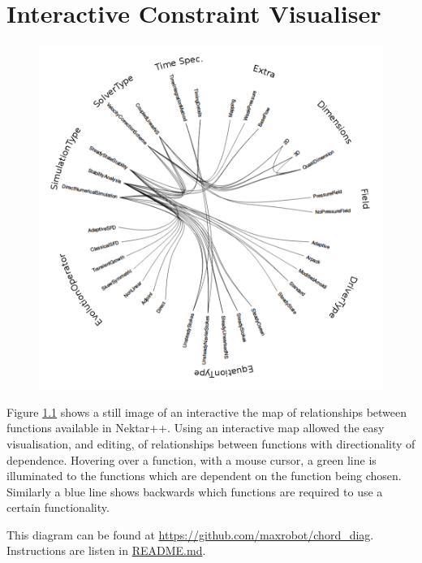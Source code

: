 \documentclass[11pt, a4paper]{report}
\begin{document}
\chapter{Interactive Constraint Visualiser}
\label{app:constraints}

\begin{figure}[htb!]
 \centering
 \includegraphics[width=.9\linewidth,  clip=true, trim = 0cm 0cm 0cm 0cm]{constraint_mapping}
 \label{fig:constraint_mapping}
\end{figure}

Figure \ref{fig:constraint_mapping} shows a still image of an interactive the map of relationships between functions available in Nektar++. Using an interactive map allowed the easy visualisation, and editing, of relationships between functions with directionality of dependence. Hovering over a function, with a mouse cursor, a green line is illuminated to the functions which are dependent on the function being chosen. Similarly a blue line shows backwards which functions are required to use a certain functionality.

This diagram can be found at \url{https://github.com/maxrobot/chord_diag}. Instructions are listen in \url{README.md}.
\end{document}
